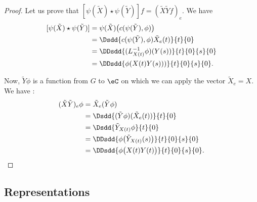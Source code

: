 \begin{proof}
Let us prove that $[\psi(\tilde X)\star\psi(\tilde Y)]f=(\tilde X\tilde Yf)_e$. We have
\begin{equation}
\begin{split}
   [\psi(\tilde X)\star\psi(\tilde Y)]&=\psi(\tilde X)\big( c(\psi(\tilde Y),\phi) \big)\\
		&=\Dsdd{ c(\psi(\tilde Y),\phi)\tilde X_e(t) }{t}{0}\\
		&=\DDsdd{ (L^{-1}_{X(t)}\phi)(Y(s)) }{t}{0}{s}{0}\\
		&=\DDsdd{ \phi(X(t)Y(s))) }{t}{0}{s}{0}.
\end{split}
\end{equation}

Now, $\tilde Y\phi$ is a function from $G$ to $\eC$ on which we can apply the vector $\tilde X_e=X$. We have :
\begin{equation}
\begin{split}
(\tilde X\tilde Y)_e\phi&=\tilde X_e(\tilde Y\phi)\\
		&=\Dsdd{ (\tilde Y\phi)(\tilde X_e(t)) }{t}{0}\\
		&=\Dsdd{ \tilde Y_{X(t)}\phi }{t}{0}\\
		&=\DDsdd{ \phi\big( \tilde Y_{X(t)}(s) \big) }{t}{0}{s}{0}\\
		&=\DDsdd{ \phi\big( X(t)Y(t) \big) }{t}{0}{s}{0}.
\end{split}
\end{equation}

\end{proof}

\subsection{Representations}

